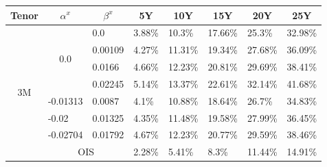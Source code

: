 \documentclass[12pt]{article}
\begin{document}
\begin{table}[H]
    \centering
    \begin{tabular}{|c||c||c||c|c|c|c|c|} \hline
    Tenor               & $\alpha^x$          & $\beta^x$                               &  5Y                      & 10Y                      & 15Y                     & 20Y                   & 25Y   \\ \hline \hline
    \multirow{8}{*}{3M} & \multirow{4}{*}{0.0}  & \multicolumn{1}{l||}{0.0}             & \multicolumn{1}{l|}{3.88\%}    & \multicolumn{1}{l|}{10.3\%}      & \multicolumn{1}{l|}{17.66\%} & \multicolumn{1}{l|}{25.3\%} & \multicolumn{1}{l|}{32.98\%}\\\cline{3-8}
                        &                          & \multicolumn{1}{l||}{0.00109}      & \multicolumn{1}{l|}{4.27\%} & \multicolumn{1}{l|}{11.31\%}     & \multicolumn{1}{l|}{19.34\%} & \multicolumn{1}{l|}{27.68\%} & \multicolumn{1}{l|}{36.09\%}\\\cline{3-8}
                        &                          & \multicolumn{1}{l||}{0.0166}       & \multicolumn{1}{l|}{4.66\%} & \multicolumn{1}{l|}{12.23\%}      & \multicolumn{1}{l|}{20.81\%} & \multicolumn{1}{l|}{29.69\%} & \multicolumn{1}{l|}{38.41\%}\\\cline{3-8}
                        &                          & \multicolumn{1}{l||}{0.02245}      & \multicolumn{1}{l|}{5.14\%} & \multicolumn{1}{l|}{13.37\%}      & \multicolumn{1}{l|}{22.61\%} & \multicolumn{1}{l|}{32.14\%} & \multicolumn{1}{l|}{41.68\%}\\\cline{2-8}
                        & \multicolumn{1}{l||}{-0.01313} & \multicolumn{1}{l||}{0.0087}  & \multicolumn{1}{l|}{4.1\%}    & \multicolumn{1}{l|}{10.88\%} & \multicolumn{1}{l|}{18.64\%} & \multicolumn{1}{l|}{26.7\%}& \multicolumn{1}{l|}{34.83\%} \\\cline{2-8}
                        & \multicolumn{1}{l||}{-0.02} & \multicolumn{1}{l||}{0.01325}    & \multicolumn{1}{l|}{4.35\%}     & \multicolumn{1}{l|}{11.48\%} & \multicolumn{1}{l|}{19.58\%} & \multicolumn{1}{l|}{27.99\%}& \multicolumn{1}{l|}{36.45\%} \\\cline{2-8}
                        & \multicolumn{1}{l||}{-0.02704} & \multicolumn{1}{l||}{0.01792}  & \multicolumn{1}{l|}{4.67\%}     & \multicolumn{1}{l|}{12.23\%} & \multicolumn{1}{l|}{20.77\%} & \multicolumn{1}{l|}{29.59\%}& \multicolumn{1}{l|}{38.46\%} \\\cline{2-8}
                        &  \multicolumn{2}{|c||}{OIS}                                   &  \multicolumn{1}{l|}{2.28\%} & \multicolumn{1}{l|}{5.41\%}      & \multicolumn{1}{l|}{8.3\%} & \multicolumn{1}{l|}{11.44\%} & \multicolumn{1}{l|}{14.91\%}\\ \hline \hline

\end{tabular}
\end{table}
\end{document}
